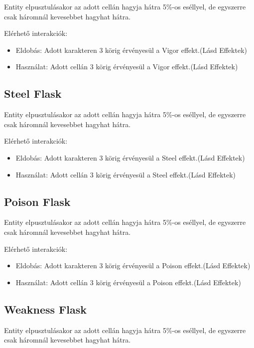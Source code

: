 Entity elpusztulásakor az adott cellán hagyja hátra 5\%-os eséllyel, de egyszerre csak háromnál kevesebbet hagyhat hátra.

\noindent Elérhető interakciók:
\begin{itemize}
    \item Eldobás: Adott karakteren 3 körig érvényesül a Vigor effekt.(Lásd Effektek)
    \item Használat: Adott cellán 3 körig érvényesül a Vigor effekt.(Lásd Effektek)
\end{itemize}

\subsection{Steel Flask}

Entity elpusztulásakor az adott cellán hagyja hátra 5\%-os eséllyel, de egyszerre csak háromnál kevesebbet hagyhat hátra.

\noindent Elérhető interakciók:
\begin{itemize}
    \item Eldobás: Adott karakteren 3 körig érvényesül a Steel effekt.(Lásd Effektek)
    \item Használat: Adott cellán 3 körig érvényesül a Steel effekt.(Lásd Effektek)
\end{itemize}

\subsection{Poison Flask}

Entity elpusztulásakor az adott cellán hagyja hátra 5\%-os eséllyel, de egyszerre csak háromnál kevesebbet hagyhat hátra.

\noindent Elérhető interakciók:
\begin{itemize}
    \item Eldobás: Adott karakteren 3 körig érvényesül a Poison effekt.(Lásd Effektek)
    \item Használat: Adott cellán 3 körig érvényesül a Poison effekt.(Lásd Effektek)
\end{itemize}

\subsection{Weakness Flask}

Entity elpusztulásakor az adott cellán hagyja hátra 5\%-os eséllyel, de egyszerre csak háromnál kevesebbet hagyhat hátra.

